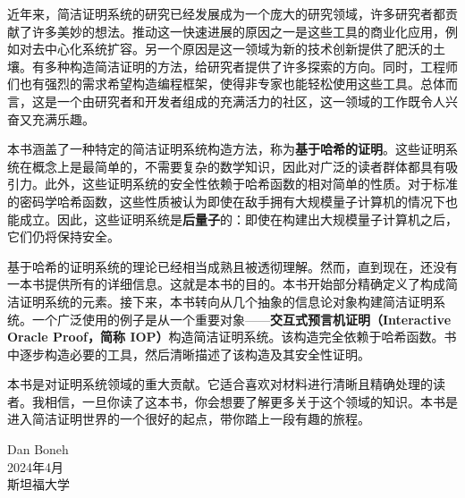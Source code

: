 \documentclass[american,singlepageview]{snargs-book-zh}
\begin{document}
近年来，简洁证明系统的研究已经发展成为一个庞大的研究领域，许多研究者都贡献了许多美妙的想法。推动这一快速进展的原因之一是这些工具的商业化应用，例如对去中心化系统扩容。另一个原因是这一领域为新的技术创新提供了肥沃的土壤。有多种构造简洁证明的方法，给研究者提供了许多探索的方向。同时，工程师们也有强烈的需求希望构造编程框架，使得非专家也能轻松使用这些工具。总体而言，这是一个由研究者和开发者组成的充满活力的社区，这一领域的工作既令人兴奋又充满乐趣。

本书涵盖了一种特定的简洁证明系统构造方法，称为\textbf{基于哈希的证明}。这些证明系统在概念上是最简单的，不需要复杂的数学知识，因此对广泛的读者群体都具有吸引力。此外，这些证明系统的安全性依赖于哈希函数的相对简单的性质。对于标准的密码学哈希函数，这些性质被认为即使在敌手拥有大规模量子计算机的情况下也能成立。因此，这些证明系统是\textbf{后量子}的：即使在构建出大规模量子计算机之后，它们仍将保持安全。

基于哈希的证明系统的理论已经相当成熟且被透彻理解。然而，直到现在，还没有一本书提供所有的详细信息。这就是本书的目的。本书开始部分精确定义了构成简洁证明系统的元素。接下来，本书转向从几个抽象的信息论对象构建简洁证明系统。一个广泛使用的例子是从一个重要对象——\textbf{交互式预言机证明（Interactive Oracle Proof，简称 IOP）}构造简洁证明系统。该构造完全依赖于哈希函数。书中逐步构造必要的工具，然后清晰描述了该构造及其安全性证明。

本书是对证明系统领域的重大贡献。它适合喜欢对材料进行清晰且精确处理的读者。我相信，一旦你读了这本书，你会想要了解更多关于这个领域的知识。本书是进入简洁证明世界的一个很好的起点，带你踏上一段有趣的旅程。


\begin{flushright}
Dan Boneh \\
2024年4月 \\
斯坦福大学
\end{flushright}


\cleardoublepage
\printbibliography
\end{document}
